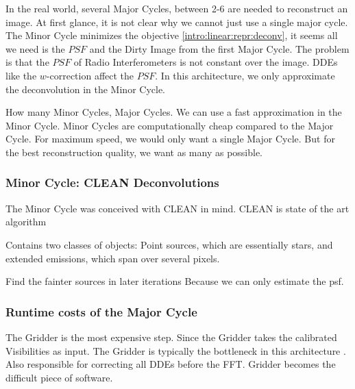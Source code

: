 In the real world, several Major Cycles, between 2-6 are needed to reconstruct an image.
At first glance, it is not clear why we cannot just use a single major cycle. The Minor Cycle minimizes the objective \eqref{intro:linear:repr:deconv}, it seems all we need is the $PSF$ and the Dirty Image from the first Major Cycle. The problem is that the $PSF$ of Radio Interferometers is not constant over the image. DDEs like the $w$-correction affect the $PSF$. In this architecture, we only approximate the deconvolution in the Minor Cycle. 

How many Minor Cycles, Major Cycles. We can use a fast approximation in the Minor Cycle. Minor Cycles are computationally cheap compared to the Major Cycle. For maximum speed, we would only want a single Major Cycle. But for the best reconstruction quality, we want as many as possible.

\subsubsection{Minor Cycle: CLEAN Deconvolutions}

The Minor Cycle was conceived with CLEAN in mind.
CLEAN is state of the art algorithm

Contains two classes of objects: Point sources, which are essentially stars, and extended emissions, which span over several pixels.


Find the fainter sources in later iterations
Because we can only estimate the psf.

\subsubsection{Runtime costs of the Major Cycle}

The Gridder is the most expensive step. 
Since the Gridder takes the calibrated Visibilities as input. The Gridder is typically the bottleneck in this architecture \cite{skastuff}.
Also responsible for correcting all DDEs before the FFT. Gridder becomes the difficult piece of software.


